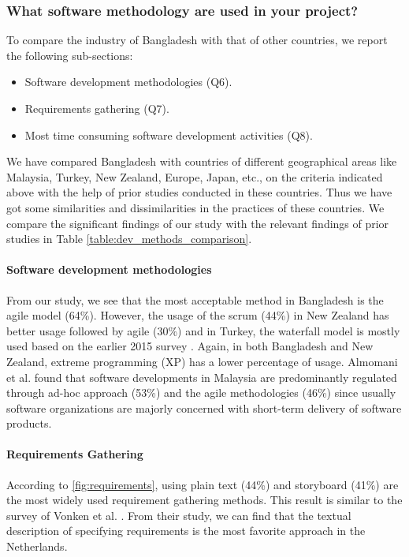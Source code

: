 \subsubsection{What software methodology are used in your project?}

To compare the industry of Bangladesh with that of other countries, we report the following sub-sections:

\begin{itemize}
\item Software development methodologies (Q6).
\item Requirements gathering (Q7).
\item Most time consuming software development activities (Q8).
\end{itemize}



We have compared Bangladesh with countries of different geographical areas like Malaysia, Turkey, New Zealand, Europe, Japan, etc., on the criteria indicated above with the help of prior studies conducted in these countries. Thus we have got some similarities and dissimilarities in the practices of these countries. We compare the significant findings of our study with the relevant findings of prior studies in Table \ref{table:dev_methods_comparison}.


\paragraph{Software development methodologies}
From our study, we see that the most acceptable method in Bangladesh is the agile model (64\%). However,  the usage of the scrum (44\%) in New Zealand has better usage followed by agile (30\%) \cite{Wang2018} and in Turkey, the waterfall model is mostly used based on the earlier 2015 survey \cite{Garousi2015}.  Again, in both Bangladesh and New Zealand, extreme programming (XP) has a lower percentage of usage. Almomani et al. \cite{Almomani2015} found that software developments in Malaysia are predominantly regulated through ad-hoc approach (53\%) and the agile methodologies (46\%) since usually software organizations are majorly concerned with short-term delivery of software products.


\paragraph{Requirements Gathering}
According to \ref{fig:requirements}, using plain text (44\%) and storyboard (41\%) are the most widely used requirement gathering methods. This result is similar to the survey of Vonken et al. \cite{Vonken2012}. From their study, we can find that the textual description of specifying requirements is the most favorite approach in the Netherlands.


